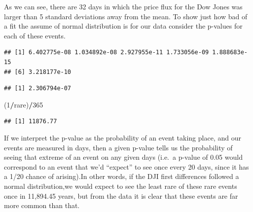 \documentclass[]{article}
\newenvironment{Shaded}{\begin{snugshade}}{\end{snugshade}}
\newcommand{\CommentTok}[1]{\textcolor[rgb]{0.56,0.35,0.01}{\textit{#1}}}
\newcommand{\ControlFlowTok}[1]{\textcolor[rgb]{0.13,0.29,0.53}{\textbf{#1}}}
\newcommand{\DataTypeTok}[1]{\textcolor[rgb]{0.13,0.29,0.53}{#1}}
\newcommand{\DecValTok}[1]{\textcolor[rgb]{0.00,0.00,0.81}{#1}}
\newcommand{\KeywordTok}[1]{\textcolor[rgb]{0.13,0.29,0.53}{\textbf{#1}}}
\newcommand{\NormalTok}[1]{#1}
\newcommand{\OperatorTok}[1]{\textcolor[rgb]{0.81,0.36,0.00}{\textbf{#1}}}
\newcommand{\OtherTok}[1]{\textcolor[rgb]{0.56,0.35,0.01}{#1}}
\newcommand{\StringTok}[1]{\textcolor[rgb]{0.31,0.60,0.02}{#1}}
\begin{document}
As we can see, there are 32 days in which the price flux for the Dow
Jones was larger than 5 standard deviations away from the mean. To show
just how bad of a fit the assume of normal distribution is for our data
consider the p-values for each of these events.

\begin{Shaded}
\end{Shaded}

\begin{verbatim}
## [1] 6.402775e-08 1.034892e-08 2.927955e-11 1.733056e-09 1.888683e-15
## [6] 3.218177e-10
\end{verbatim}

\begin{Shaded}
\end{Shaded}

\begin{verbatim}
## [1] 2.306794e-07
\end{verbatim}

\begin{Shaded}
\begin{Highlighting}[]
\NormalTok{(}\DecValTok{1}\OperatorTok{/}\NormalTok{rare)}\OperatorTok{/}\DecValTok{365}
\end{Highlighting}
\end{Shaded}

\begin{verbatim}
## [1] 11876.77
\end{verbatim}

If we interpret the p-value as the probability of an event taking place,
and our events are measured in days, then a given p-value tells us the
probability of seeing that extreme of an event on any given days (i.e.~a
p-value of 0.05 would correspond to an event that we'd ``expect'' to see
once every 20 days, since it has a 1/20 chance of arising).In other
words, if the DJI first differences followed a normal distribution,we
would expect to see the least rare of these rare events once in
11,894.45 years, but from the data it is clear that these events are far
more common than that.
\end{document}
